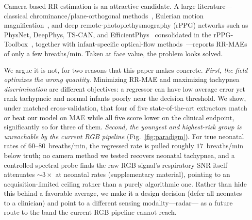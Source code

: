 \documentclass[journal]{IEEEtran}
\begin{document}
Camera-based RR estimation is an attractive candidate. A large literature---classical
chrominance/plane-orthogonal methods~\cite{chrom_dehaan,pos_wang}, Eulerian motion
magnification~\cite{evm_wu}, and deep remote-photoplethysmography (rPPG) networks such as
PhysNet, DeepPhys, TS-CAN, and EfficientPhys~\cite{yu_physnet,mcduff_deepphys,liu_mttscan,liu_efficientphys}
consolidated in the rPPG-Toolbox~\cite{liu_rppgtoolbox}, together with infant-specific optical-flow
methods~\cite{infant_air}---reports RR-MAEs of only a few breaths/min. Taken at face value, the problem
looks solved.

We argue it is not, for two reasons that this paper makes concrete. \emph{First, the field optimizes the
wrong quantity.} Minimizing RR-MAE and maximizing tachypnea \emph{discrimination} are different
objectives: a regressor can have low average error yet rank tachypneic and normal infants poorly near
the decision threshold. We show, under matched cross-validation, that four of five state-of-the-art extractors
match or beat our model on MAE while all five score lower on the clinical endpoint, significantly so for
three of them.
\emph{Second, the youngest and highest-risk group is unreachable by the current RGB pipeline} (Fig.~\ref{fig:paradigm}). For true neonatal rates of
$60$--$80$~breaths/min, the regressed rate is pulled roughly $17$~breaths/min below truth; no camera method we
tested recovers neonatal tachypnea, and a controlled spectral probe finds the raw RGB signal's respiratory
SNR itself attenuates $\sim$$3\times$ at neonatal rates (supplementary material), pointing to an
acquisition-limited ceiling rather than a purely algorithmic one. Rather than hide this behind a favorable average, we make it a
design decision (defer all neonates to a clinician) and point to a different sensing modality---radar---%
as a future route to the band the current RGB pipeline cannot reach.
\end{document}
